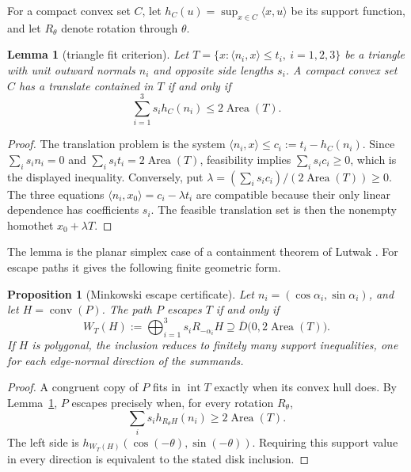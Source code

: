 \documentclass[11pt]{amsart}
\newtheorem{lemma}[theorem]{Lemma}
\newtheorem{proposition}[theorem]{Proposition}
\theoremstyle{remark}
\begin{document}
For a compact convex set $C$, let
$h_C(u)=\sup_{x\in C}\langle x,u\rangle$ be its support function, and let
$R_\theta$ denote rotation through $\theta$.

\begin{lemma}[triangle fit criterion]\label{lem:fit}
Let
$T=\{x:\langle n_i,x\rangle\le t_i,\ i=1,2,3\}$ be a triangle with unit
outward normals $n_i$ and opposite side lengths $s_i$.  A compact convex
set $C$ has a translate contained in $T$ if and only if
\[
 \sum_{i=1}^3 s_i h_C(n_i)\le 2\operatorname{Area}(T).
\]
\end{lemma}

\begin{proof}
The translation problem is the system
$\langle n_i,x\rangle\le c_i:=t_i-h_C(n_i)$.  Since
$\sum_i s_i n_i=0$ and $\sum_i s_i t_i=2\operatorname{Area}(T)$, feasibility
implies $\sum_i s_i c_i\ge0$, which is the displayed inequality.
Conversely, put
$\lambda=(\sum_i s_i c_i)/(2\operatorname{Area}(T))\ge0$.  The three
equations
$\langle n_i,x_0\rangle=c_i-\lambda t_i$ are compatible because their only
linear dependence has coefficients $s_i$.  The feasible translation set is
then the nonempty homothet $x_0+\lambda T$.
\end{proof}

The lemma is the planar simplex case of a containment theorem of Lutwak
\cite{lutwak1998}.  For escape paths it gives the following finite geometric
form.

\begin{proposition}[Minkowski escape certificate]\label{prop:minkowski}
Let $n_i=(\cos\alpha_i,\sin\alpha_i)$, and let
$H=\operatorname{conv}(P)$.  The path $P$ escapes $T$ if and only if
\[
 W_T(H):=\bigoplus_{i=1}^3 s_iR_{-\alpha_i}H
 \supseteq \overline D\bigl(0,2\operatorname{Area}(T)\bigr).
\]
If $H$ is polygonal, the inclusion reduces to finitely many support
inequalities, one for each edge-normal direction of the summands.
\end{proposition}

\begin{proof}
A congruent copy of $P$ fits in $\operatorname{int}T$ exactly when its convex
hull does.  By Lemma~\ref{lem:fit}, $P$ escapes precisely when, for every
rotation $R_\theta$,
\[
 \sum_i s_i h_{R_\theta H}(n_i)
 \ge 2\operatorname{Area}(T).
\]
The left side is
$h_{W_T(H)}(\cos(-\theta),\sin(-\theta))$.  Requiring this support value in
every direction is equivalent to the stated disk inclusion.
\end{proof}
\end{document}
